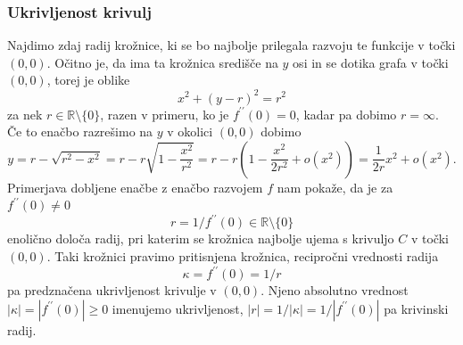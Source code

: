 \documentclass[8pt]{beamer}
\theoremstyle{definition}
\theoremstyle{remark}
\theoremstyle{plain}
\numberwithin{equation}{section}  %
\begin{document}
\begin{frame}
    \frametitle{Ukrivljenost krivulj}

    Najdimo zdaj radij krožnice, ki se bo najbolje prilegala razvoju te funkcije v točki $(0,0)$. Očitno je, da ima ta krožnica središče na $y$ osi in se dotika grafa v točki $(0,0)$, torej je oblike
    \begin{equation*}
        x^2+(y-r)^2=r^2
    \end{equation*}
    za nek $r \in \mathbb{R} \setminus \{0\}$, razen v primeru, ko je $f^{\prime \prime}(0)=0$, kadar pa dobimo $r=\infty$. Če to enačbo razrešimo na $y$ v okolici $(0,0)$ dobimo 
    \begin{equation*}
        y=r-\sqrt{r^2-x^2}=r-r \sqrt{1-\frac{x^2}{r^2}}=r-r\left(1-\frac{x^2}{2 r^2}+o\left(x^2\right)\right)=\frac{1}{2 r} x^2+o\left(x^2\right).
    \end{equation*}
    Primerjava dobljene enačbe z enačbo razvojem $f$ nam pokaže, da je za $f^{\prime \prime}(0)\neq0$ 
    \begin{equation*}
        r=1 / f^{\prime \prime}(0) \in \mathbb{R} \setminus \{0\}
    \end{equation*}
    enolično določa radij, pri katerim se krožnica najbolje ujema s krivuljo $C$ v točki $(0,0)$. Taki krožnici pravimo \textcolor{red1}{pritisnjena krožnica}, recipročni vrednosti radija 
    \begin{equation*}
        \kappa=f^{\prime \prime}(0)=1 / r
    \end{equation*}
    pa \textcolor{red1}{predznačena ukrivljenost} krivulje v $(0,0)$. Njeno absolutno vrednost $|\kappa|=\left|f^{\prime \prime}(0)\right| \geq 0$ imenujemo \textcolor{red1}{ukrivljenost}, $|r|=1 /|\kappa|=1 /\left|f^{\prime \prime}(0)\right|$ pa \textcolor{red1}{krivinski radij}. 

\end{frame}
\end{document}
